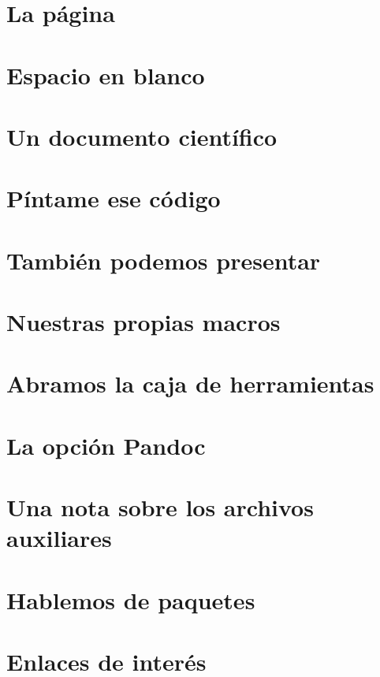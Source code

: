 \documentclass[a4paper,10pt]{book}
\begin{document}
\chapter{La página}


\chapter{Espacio en blanco}\label{ch:blanco}


\chapter{Un documento científico}


\chapter{Píntame ese código}


\chapter{También podemos presentar}


\chapter{Nuestras propias macros}


\chapter{Abramos la caja de herramientas}


\chapter{La opción Pandoc}


\appendix
\chapter{Una nota sobre los archivos auxiliares}


\chapter{Hablemos de paquetes}


\chapter{Enlaces de interés}


\backmatter
% 
%
\end{document}
